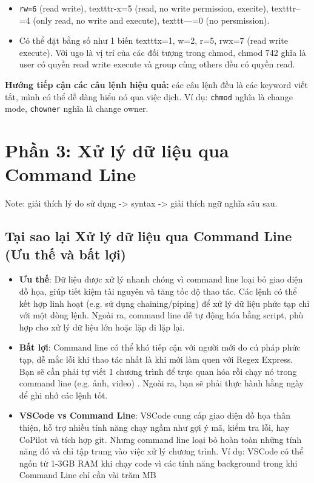 \documentclass[11pt]{article}
\begin{document}
\begin{itemize}
\item \texttt{rw=6} (read write), texttt{r-x=5} (read, no write permission, execite), texttt{r--=4} (only read, no write and execute), texttt{---=0} (no persmission).
\item Có thể đặt bằng số như 1 biến texttt{x=1, w=2, r=5, rwx=7} (read write execute). Với ugo là vị trí của các đối tượng trong chmod, chmod 742 ghĩa là user có quyền read write execute và group cùng others đều có quyền read. \\
\end{itemize}

\textbf{Hướng tiếp cận các câu lệnh hiệu quả:} các câu lệnh đều là các keyword viết tắt, mình có thể dễ dàng hiểu nó qua việc dịch. Ví dụ: \texttt{chmod} nghĩa là change mode, \texttt{chowner} nghĩa là change owner.

\section{Phần 3: Xử lý dữ liệu qua Command Line}
Note: giải thích lý do sử dụng -> syntax -> giải thích ngữ nghĩa sâu sau.

\subsection{Tại sao lại Xử lý dữ liệu qua Command Line (Ưu thế và bất lợi)}
\begin{itemize}
	\item \textbf{Ưu thế}: Dữ liệu được xử lý nhanh chóng vì command line loại bỏ giao diện đồ họa, giúp tiết kiệm tài nguyên và tăng tốc độ thao tác. Các lệnh có thể kết hợp linh hoạt (e.g. sử dụng chaining/piping) để xử lý dữ liệu phức tạp chỉ với một dòng lệnh. Ngoài ra, command line dễ tự động hóa bằng script, phù hợp cho xử lý dữ liệu lớn hoặc lặp đi lặp lại.
	\item \textbf{Bất lợi}: Command line có thể khó tiếp cận với người mới do cú pháp phức tạp, dễ mắc lỗi khi thao tác nhất là khi mới làm quen với Regex Express. Bạn sẽ cần phải tự viết 1 chương trình để trực quan hóa rồi chạy nó trong command line (e.g. ảnh, video) . Ngoài ra, bạn sẽ phải thực hành hằng ngày để ghi nhớ các lệnh tốt.
	\item \textbf{VSCode vs Command Line}: VSCode cung cấp giao diện đồ họa thân thiện, hỗ trợ nhiều tính năng chạy ngầm như gợi ý mã, kiểm tra lỗi, hay CoPilot và tích hợp git. Nhưng command line loại bỏ hoàn toàn những tính năng đó và chỉ tập trung vào việc xử lý chương trình. Ví dụ: VSCode có thể ngốn từ 1-3GB RAM khi chạy code vì các tính năng background trong khi Command Line chỉ cần vài trăm MB
\end{itemize}
\end{document}
